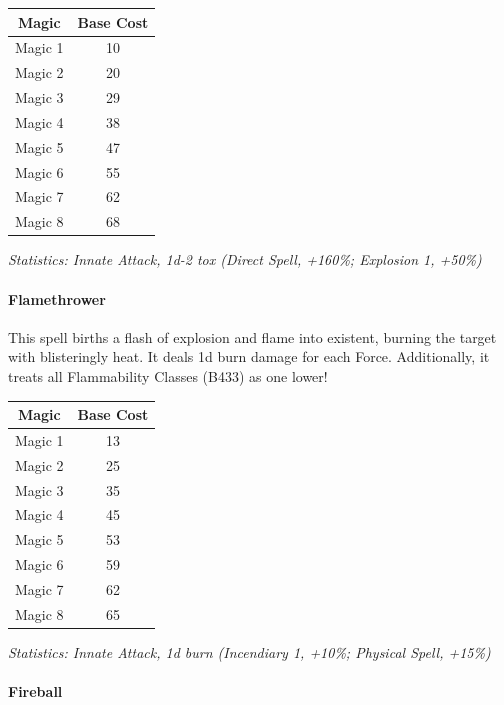 \begin{multicols}{3}
	\begin{center}
		\begin{tabular}{|c|c|}
			\hline
			Magic & Base Cost \\
			\hline
			\hline
			Magic 1 & 10 \\
			Magic 2 & 20 \\
			Magic 3 & 29 \\
			Magic 4 & 38 \\
			Magic 5 & 47 \\
			Magic 6 & 55 \\
			Magic 7 & 62 \\
			Magic 8 & 68 \\
			\hline
		\end{tabular}
	\end{center}
	
	\textcolor{OliveGreen}{\textit{Statistics: Innate Attack, 1d-2 tox (Direct Spell, +160\%; Explosion 1, +50\%)}}
	
	\paragraph{Flamethrower}
	
	This spell births a flash of explosion and flame into existent, burning the target with blisteringly heat. It deals 1d burn damage for each Force. Additionally, it treats all Flammability Classes (B433) as one lower!
	
	\begin{center}
		\begin{tabular}{|c|c|}
			\hline
			Magic & Base Cost \\
			\hline
			\hline
			Magic 1 & 13 \\
			Magic 2 & 25 \\
			Magic 3 & 35 \\
			Magic 4 & 45 \\
			Magic 5 & 53 \\
			Magic 6 & 59 \\
			Magic 7 & 62 \\
			Magic 8 & 65 \\
			\hline
		\end{tabular}
	\end{center}
	
	\textcolor{OliveGreen}{\textit{Statistics: Innate Attack, 1d burn (Incendiary 1, +10\%; Physical Spell, +15\%)}}
	
	\paragraph{Fireball}
	

\end{multicols}
